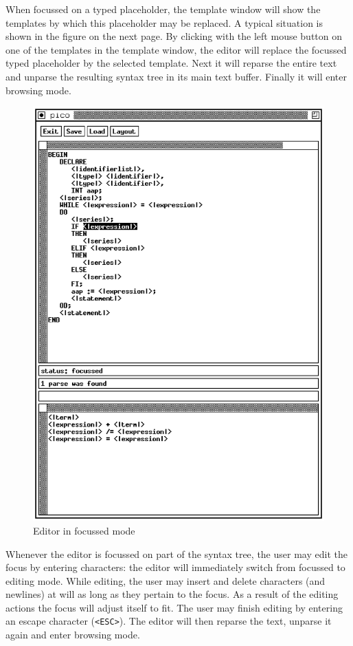 When focussed on a typed placeholder, the template window will show
the templates by which this placeholder may be replaced. A typical
situation is shown in the figure on the next page. By clicking with
the left mouse button on one of the templates in the template window,
the editor will replace the focussed typed placeholder by the selected
template. Next it will reparse the entire text and unparse the
resulting syntax tree in its main text buffer. Finally it will enter
browsing mode.
\begin{figure}[t]
\begin {center}
\includegraphics[bb = 115 125 495 665]{pico2.eps}
\end {center}
\caption {Editor in focussed mode}
\end {figure}

Whenever the editor is focussed on part of the syntax tree, the user
may edit the focus by entering characters: the editor will immediately
switch from focussed to editing mode. While editing, the user may insert
and delete characters (and newlines) at will as long as they pertain to
the focus. As a result of the editing actions the focus will adjust
itself to fit. The user may finish editing by entering an escape character
(\verb+<ESC>+). The editor will then reparse the text, unparse it again
and enter browsing mode.\clearpage
